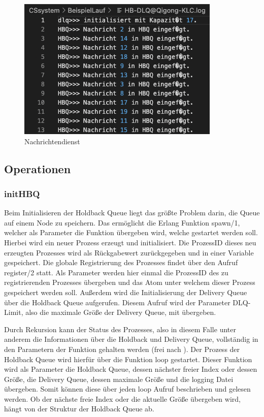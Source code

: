 \begin{figure}[htbp]
\begin{center}
\includegraphics[scale=0.6]{Bilder/HBQFilesEntry.png}
\caption{\label{fig:HBQFilesEntry} Nachrichtendienst \cite{HBQlogging}} 
\end{center}
\end{figure}

\subsection{Operationen}

\subsubsection{initHBQ}

Beim Initialisieren der Holdback Queue liegt das größte Problem darin, die Queue auf einem Node zu speichern. Das ermöglicht die Erlang Funktion spawn/1, welcher als Parameter die Funktion übergeben wird, welche gestartet werden soll. Hierbei wird ein neuer Prozess erzeugt und initialisiert. Die ProzessID dieses neu erzeugten Prozesses wird als Rückgabewert zurückgegeben und in einer Variable gespeichert. 
Die globale Registrierung des Prozesses findet über den Aufruf register/2 statt. Als Parameter werden hier einmal die ProzessID des zu registrierenden Prozesses übergeben und das Atom unter welchem dieser Prozess gespeichert werden soll. 
Außerdem wird die Initialisierung der Delivery Queue über die Holdback Queue aufgerufen. Diesem Aufruf wird der Parameter DLQ-Limit, also die maximale Größe der Delivery Queue, mit übergeben. 

Durch Rekursion kann der Status des Prozesses, also in diesem Falle unter anderem die Informationen über die Holdback und Delivery Queue, vollständig in den Parametern der Funktion gehalten werden (frei nach \cite{learnErlang}). Der Prozess der Holdback Queue wird hierfür über die Funktion loop gestartet. Dieser Funktion wird als Parameter die Holdback Queue, dessen nächster freier Index oder dessen Größe, die Delivery Queue, dessen maximale Größe und die logging Datei übergeben. Somit können diese über jeden loop Aufruf beschrieben und gelesen werden. 
Ob der nächste freie Index oder die aktuelle Größe übergeben wird, hängt von der Struktur der Holdback Queue ab. 

